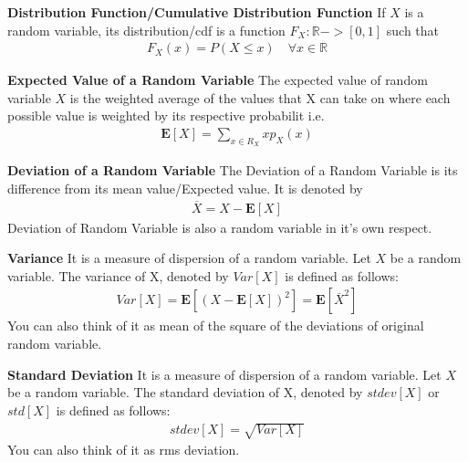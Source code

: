 \documentclass[10pt,a4paper]{article}
\newcommand{\R}{\mathbb{R}}
\begin{document}
	\begin{defn}{\textbf{Distribution Function/Cumulative Distribution Function}}
		If $X$ is a random variable, its distribution/cdf is a function $F_X : \R -> [0,1]$ such that \\
		\begin{align}
			F_X(x) = P(X \le x) \quad \forall x \in \R
		\end{align}
	\end{defn}

	\begin{defn}{\textbf{Expected Value of a Random Variable}}
	The expected value of random variable $X$ is the weighted average of the values that X can take on where each possible value is weighted by its respective probabilit i.e. \\
	\begin{align}
		\mathbf{E}[X] = \sum\limits_{x \in R_X}xp_X(x)
	\end{align}
	\end{defn}

	\begin{defn}{\textbf{Deviation of a Random Variable}}
	The Deviation of a Random Variable is its difference from its mean value/Expected value. It is denoted by 
	\begin{align}
		\overline{X} = X - \mathbf{E}[X]
	\end{align}
	Deviation of Random Variable is also a random variable in it's
	own respect.
	\end{defn}

	\begin{defn}{\textbf{Variance}}
		It is a measure of dispersion of a random variable. Let $X$ be a random variable. The variance of X, denoted by $Var[X]$ is defined as follows:\\
		\begin{align}
			Var[X] = \mathbf{E}[(X - \mathbf{E}[X])^2] = \mathbf{E}[\overline{X}^2]
		\end{align}
		You can also think of it as mean of the square of the deviations of original random variable.
	\end{defn}

	\begin{defn}{\textbf{Standard Deviation}}
	It is a measure of dispersion of a random variable. Let $X$ be a random variable. The standard deviation of X, denoted by $stdev[X]$ or $std[X]$ is defined as follows:\\
	\begin{align}
	stdev[X] = \sqrt{Var[X]}
	\end{align}
	You can also think of it as rms deviation.
	\end{defn}
\end{document}
